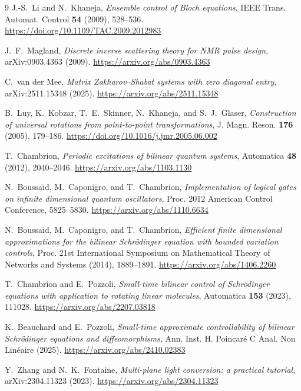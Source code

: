 \documentclass[11pt]{article}
\theoremstyle{remark}
\begin{document}
\begin{sloppypar}
\begin{thebibliography}{9}
J.-S.~Li and N.~Khaneja,
\emph{Ensemble control of Bloch equations},
IEEE Trans. Automat. Control \textbf{54} (2009), 528--536.
\url{https://doi.org/10.1109/TAC.2009.2012983}

J.~F.~Magland,
\emph{Discrete inverse scattering theory for NMR pulse design},
arXiv:0903.4363 (2009).
\url{https://arxiv.org/abs/0903.4363}

C.~van der Mee,
\emph{Matrix Zakharov--Shabat systems with zero diagonal entry},
arXiv:2511.15348 (2025).
\url{https://arxiv.org/abs/2511.15348}

B.~Luy, K.~Kobzar, T.~E.~Skinner, N.~Khaneja, and S.~J.~Glaser,
\emph{Construction of universal rotations from point-to-point
transformations},
J. Magn. Reson. \textbf{176} (2005), 179--186.
\url{https://doi.org/10.1016/j.jmr.2005.06.002}

T.~Chambrion,
\emph{Periodic excitations of bilinear quantum systems},
Automatica \textbf{48} (2012), 2040--2046.
\url{https://arxiv.org/abs/1103.1130}

N.~Boussa\"\i d, M.~Caponigro, and T.~Chambrion,
\emph{Implementation of logical gates on infinite dimensional quantum
oscillators},
Proc. 2012 American Control Conference, 5825--5830.
\url{https://arxiv.org/abs/1110.6634}

N.~Boussa\"\i d, M.~Caponigro, and T.~Chambrion,
\emph{Efficient finite dimensional approximations for the bilinear
Schr\"odinger equation with bounded variation controls},
Proc. 21st International Symposium on Mathematical Theory of Networks and
Systems (2014), 1889--1891.
\url{https://arxiv.org/abs/1406.2260}

T.~Chambrion and E.~Pozzoli,
\emph{Small-time bilinear control of Schr\"odinger equations with application
to rotating linear molecules},
Automatica \textbf{153} (2023), 111028.
\url{https://arxiv.org/abs/2207.03818}

K.~Beauchard and E.~Pozzoli,
\emph{Small-time approximate controllability of bilinear Schr\"odinger
equations and diffeomorphisms},
Ann. Inst. H. Poincar\'e C Anal. Non Lin\'eaire (2025).
\url{https://arxiv.org/abs/2410.02383}

Y.~Zhang and N.~K.~Fontaine,
\emph{Multi-plane light conversion: a practical tutorial},
arXiv:2304.11323 (2023).
\url{https://arxiv.org/abs/2304.11323}

\end{thebibliography}
\end{sloppypar}
\end{document}

